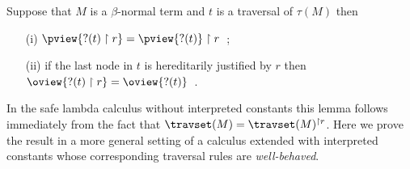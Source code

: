 \begin{lemma}
\label{lem:redtrav_trav} Suppose that $M$ is a $\beta$-normal term and $t$ is a traversal of $\tau(M)$ then
\begin{itemize}
\item[(i)] $ \pview{?(t) \upharpoonright  r } = \pview{?(t)} \upharpoonright r$\ ;
\item[(ii)] if the last node in $t$ is hereditarily justified by $r$ then $ \oview{?(t) \upharpoonright r } = \oview{?(t)}$\ .
\end{itemize}
\end{lemma}
In the safe lambda calculus without interpreted constants this lemma
follows immediately from the fact that $\travset(M) =
\travset(M)^{\upharpoonright r }$. Here we prove the result in a
more general setting of a calculus extended with interpreted
constants whose corresponding traversal rules are
\emph{well-behaved}.


